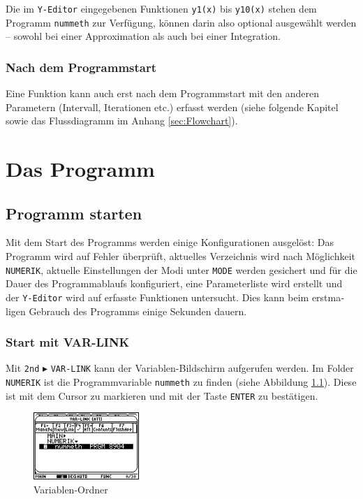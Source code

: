 \documentclass[
	a4paper							%
	,12pt							%
	,twoside						%
	,openright						%
]{scrreprt}							%
\begin{document}
Die im \verb|Y-Editor| eingegebenen Funktionen \verb|y1(x)| bis \verb|y10(x)| stehen dem Programm \verb|nummeth| zur Verf\"ugung, k\"onnen darin also optional ausgew\"ahlt werden -- sowohl bei einer Approximation als auch bei einer Inte­gration.

\subsection*{Nach dem Programmstart}
Eine Funktion kann auch erst nach dem Programmstart mit den anderen Parametern (Intervall, Iterationen etc.) erfasst werden (siehe folgende Kapitel sowie das Flussdiagramm im Anhang \ref{sec:Flowchart}).

\chapter{Das Programm}
\section{Programm starten}
Mit dem Start des Programms werden einige Konfigurationen ausgel\"ost: Das Programm wird auf Fehler \"uberpr\"uft, aktuelles Ver­zeich­nis wird nach M\"oglichkeit \verb|NUMERIK|, aktuelle Einstellungen der Modi unter \verb|MODE| werden gesichert und f\"ur die Dauer des Pro­gramm­ab­laufs konfiguriert, eine Parameterliste wird erstellt und der \verb|Y-Editor| wird auf erfasste Funk­tio­nen untersucht. Dies kann beim erst­ma­ligen Gebrauch des Programms einige Sekunden dauern.

\subsection*{Start mit VAR-LINK}
Mit \verb|2nd| $\blacktriangleright$ \verb|VAR-LINK| kann der Variablen-Bildschirm aufgerufen werden. Im Folder \verb|NUMERIK| ist die Pro­gramm­variable \verb|nummeth| zu finden (siehe Abbildung \ref{fig:VARLINK}). Diese ist mit dem Cursor zu markieren und mit der Taste \verb|ENTER| zu bes­t\"a­ti­gen.
\begin{figure}[h]
  \centering
  \includegraphics[width=4cm]{img/nummeth_image001.png}
  \caption{Variablen-Ordner}
  \label{fig:VARLINK}
\end{figure}
\end{document}
